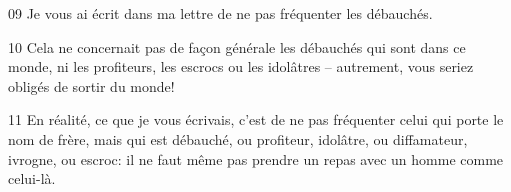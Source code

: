 
09 Je vous ai écrit dans ma lettre de ne pas fréquenter les débauchés.

10 Cela ne concernait pas de façon générale les débauchés qui sont dans ce monde, ni les profiteurs, les escrocs ou les idolâtres – autrement, vous seriez obligés de sortir du monde!

11 En réalité, ce que je vous écrivais, c’est de ne pas fréquenter celui qui porte le nom de frère, mais qui est débauché, ou profiteur, idolâtre, ou diffamateur, ivrogne, ou escroc: il ne faut même pas prendre un repas avec un homme comme celui-là.